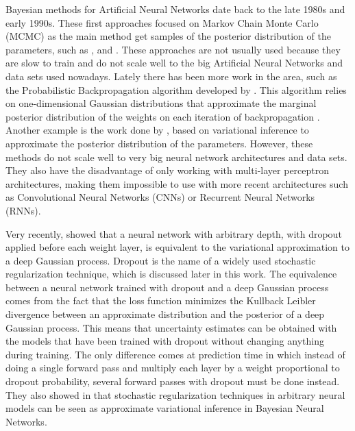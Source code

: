 Bayesian methods for Artificial Neural Networks date back to the late 1980s and early 1990s. These first approaches focused on Markov Chain Monte Carlo (MCMC) as the main method get samples of the posterior distribution of the parameters, such as \citeauthor{neal1996bayesian} \cite{neal1996bayesian}, \citeauthor{denker1991transforming} \cite{denker1991transforming} and \citeauthor{mackay1992practical} \cite{mackay1992practical}. These approaches are not usually used because they are slow to train and do not scale well to the big Artificial Neural Networks and data sets used nowadays. Lately there has been more work in the area, such as the Probabilistic Backpropagation algorithm developed by \citeauthor{hernandez2015probabilistic} \cite{hernandez2015probabilistic}. This algorithm relies on one-dimensional Gaussian distributions that approximate the marginal posterior distribution of the weights on each iteration of backpropagation . Another example is the work done by \citeauthor{graves2011practical} \cite{graves2011practical}, based on variational inference to approximate the posterior distribution of the parameters. However, these methods do not scale well to very big neural network architectures and data sets. They also have the disadvantage of only working with multi-layer perceptron architectures, making them impossible to use with more recent architectures such as Convolutional Neural Networks (CNNs) or Recurrent Neural Networks (RNNs).

Very recently, \citeauthor{gal2015dropout1} \cite{gal2015dropout1} showed that a neural network with arbitrary depth, with dropout applied before each weight layer, is equivalent to the variational approximation to a deep Gaussian process. Dropout is the name of a widely used stochastic regularization technique, which is discussed later in this work. The equivalence between a neural network trained with dropout and a deep Gaussian process comes from the fact that the loss function minimizes the Kullback Leibler divergence between an approximate distribution and the posterior of a deep Gaussian process. This means that uncertainty estimates can be obtained with the models that have been trained with dropout without changing anything during training. The only difference comes at prediction time in which instead of doing a single forward pass and multiply each layer by a weight proportional to dropout probability, several forward passes with dropout must be done instead. They also showed in \cite{gal2015modern} that stochastic regularization techniques in arbitrary neural models can be seen as approximate variational inference in Bayesian Neural Networks.

